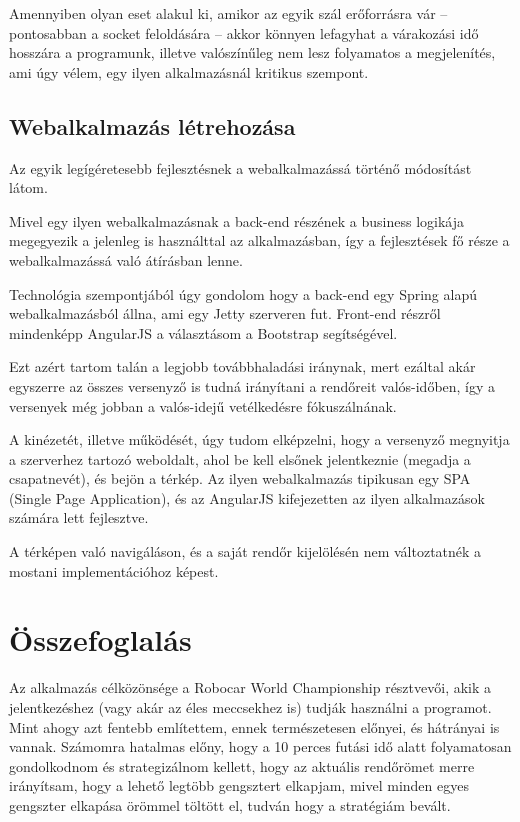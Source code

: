 \documentclass[a4paper,12pt]{report}
\begin{document}
\vspace{2mm}
Amennyiben olyan eset alakul ki, amikor az egyik szál erőforrásra vár -- pontosabban a socket feloldására -- akkor könnyen lefagyhat a várakozási idő hosszára a programunk, illetve valószínűleg nem lesz folyamatos a megjelenítés, ami úgy vélem, egy ilyen alkalmazásnál kritikus szempont.

\section{Webalkalmazás létrehozása}

Az egyik legígéretesebb fejlesztésnek a webalkalmazássá történő módosítást látom.

\vspace{2mm}
Mivel egy ilyen webalkalmazásnak a back-end részének a business logikája megegyezik a jelenleg is használttal az alkalmazásban, így a fejlesztések fő része a webalkalmazássá való átírásban lenne.

\vspace{2mm}
Technológia szempontjából úgy gondolom hogy a back-end egy Spring \cite{spring} alapú webalkalmazásból állna, ami egy Jetty \cite{jetty} szerveren fut. Front-end részről mindenképp AngularJS \cite{angularjs} a választásom a Bootstrap \cite{bootstrap} segítségével.

\vspace{2mm}
Ezt azért tartom talán a legjobb továbbhaladási iránynak, mert ezáltal akár egyszerre az összes versenyző is tudná irányítani a rendőreit valós-időben, így a versenyek még jobban a valós-idejű vetélkedésre fókuszálnának.

\vspace{2mm}
A kinézetét, illetve működését, úgy tudom elképzelni, hogy a versenyző megnyitja a szerverhez tartozó weboldalt, ahol be kell elsőnek jelentkeznie (megadja a csapatnevét), és bejön a térkép. Az ilyen webalkalmazás tipikusan egy SPA (Single Page Application), és az AngularJS kifejezetten az ilyen alkalmazások számára lett fejlesztve.

\vspace{2mm}
A térképen való navigáláson, és a saját rendőr kijelölésén nem változtatnék a mostani implementációhoz képest.

\newpage
\chapter{Összefoglalás}
\label{summary}

Az alkalmazás célközönsége a Robocar World Championship résztvevői, akik a jelentkezéshez (vagy akár az éles meccsekhez is) tudják használni a programot. Mint ahogy azt fentebb említettem, ennek természetesen előnyei, és hátrányai is vannak. Számomra hatalmas előny, hogy a 10 perces futási idő alatt folyamatosan gondolkodnom és strategizálnom kellett, hogy az aktuális rendőrömet merre irányítsam, hogy a lehető legtöbb gengsztert elkapjam, mivel minden egyes gengszter elkapása örömmel töltött el, tudván hogy a stratégiám bevált.
\end{document}
